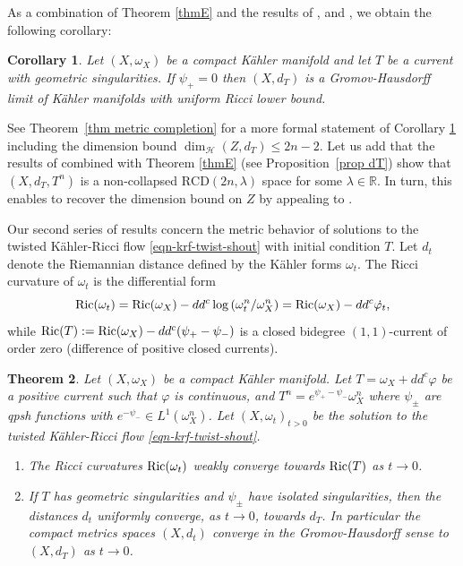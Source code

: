 \documentclass[a4paper,11pt,leqno,english]{smfart}
\theoremstyle{plain}
\theoremstyle{plain}
\newtheorem{bigthm}{Theorem}
\newtheorem{bigcoro}[bigthm]{Corollary}
\numberwithin{equation}{section} %
\numberwithin{figure}{section} %
\theoremstyle{plain}
\theoremstyle{plain}
\theoremstyle{remark}
\theoremstyle{remark}
\theoremstyle{definition}
\theoremstyle{plain}
\theoremstyle{plain}
\theoremstyle{definition}
\newcommand{\R}{{\mathbb{R}}}
\newcommand{\f}{\varphi}
\newcommand{\p}{\psi}
\renewcommand{\le}{\leq}
\begin{document}
As a combination of Theorem \ref{thmE} and the results of \cite{CCII}, \cite{LS18} and \cite{CJN}, we obtain the following corollary:
 \begin{bigcoro}\label{coro-B}
  Let $(X,\omega_X)$ be a compact K\"ahler manifold and let $T$ be a current
with geometric singularities. If  $\psi_+=0$ then $(X,d_T)$ is a Gromov-Hausdorff limit of K\"ahler manifolds with uniform Ricci lower bound. 
 \end{bigcoro}
 
 See Theorem~\ref{thm metric completion} for a more formal statement of Corollary \ref{coro-B} including the dimension bound $\dim_{\mathcal H} (Z,d_T)\le 2n-2$. Let us add that the results of \cite{G+} combined with Theorem \ref{thmE} (see Proposition~\ref{prop dT}) show that $(X,d_T,T^n)$ is a non-collapsed $\mathrm{RCD}(2n,\lambda)$ space for some $\lambda \in \R$. In turn, this enables to recover the dimension bound on $Z$ by appealing to \cite{Sz25}.
 
 \medskip
 
Our second series of results concern the metric behavior of solutions to the twisted K\"ahler-Ricci flow \eqref{eqn-krf-twist-shout} with initial condition $T$.
Let $d_t$ denote the Riemannian distance defined by the K\"ahler forms $\omega_t$.
The Ricci curvature of $\omega_t$ is the differential form
$$
{\rm Ric}(\omega_t)={\rm Ric}(\omega_X)-dd^c \log \left( \omega_t^n/\omega_X^n \right)={\rm Ric}(\omega_X)-dd^c \dot{\f_t},
$$
while   ${\rm Ric}(T):={\rm Ric}(\omega_X)-dd^c (\p_+-\p_-)$ is
a closed bidegree $(1,1)$-current of order zero
(difference of positive closed currents).
 

       \begin{bigthm} \label{thmB}
     Let $(X,\omega_X)$ be a compact K\"ahler manifold.  Let $T=\omega_X+dd^c\varphi$ be a positive current such that $\varphi$ is continuous, and $T^n=e^{\psi_+-\psi_{-}}\omega_X^n$ where $\p_{\pm}$ are qpsh functions 
     with $e^{-\psi_{-}}\in L^1(\omega_X^n)$.
   Let $(X,\omega_t)_{t>0}$ be the solution to the twisted K\"ahler-Ricci flow \eqref{eqn-krf-twist-shout}.  
   \begin{enumerate}[label=$(\roman*)$]
\item The Ricci curvatures ${\rm Ric}(\omega_t)$ weakly converge towards ${\rm Ric}(T)$ as $t \rightarrow 0$.

\smallskip

  \item   If $T$ has  geometric singularities and $\p_{\pm}$ have isolated singularities,
then the distances $d_{t}$ uniformly converge, as $t \rightarrow 0$, towards $d_{T}$.
In particular the compact metrics spaces $(X,d_{t})$ converge in the Gromov-Hausdorff sense
to  $(X,d_{T})$ as $t \rightarrow 0$.
\end{enumerate}
 \end{bigthm} 
 
\end{document}
